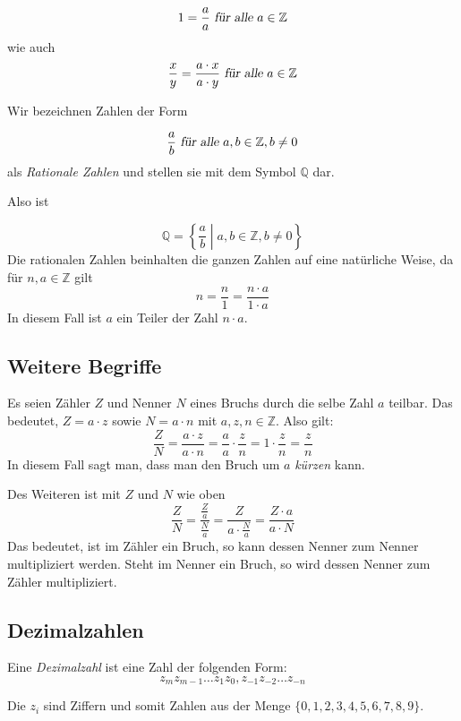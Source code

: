 \[ 1 = \frac{a}{a} \textsl{ für alle } a\in \mathbb{Z} \]
wie auch 
\begin{equation}
\label{relation}
\frac{x}{y} = \frac{a\cdot x}{a\cdot y} \textsl{ für alle } a\in \mathbb{Z}
\end{equation}

\begin{definition}
Wir bezeichnen Zahlen der Form 

\[ \frac{a}{b} \textsl{ für alle } a,b \in \mathbb{Z}, b\ne 0\]
als \textsl{Rationale Zahlen} und stellen sie mit dem Symbol $\mathbb{Q}$ dar. 
\end{definition}
Also ist 

\[ \mathbb{Q} = \left\{ \frac{a}{b} \middle\vert a,b \in \mathbb{Z}, b\ne 0 \right\} \]
Die rationalen Zahlen beinhalten die ganzen Zahlen auf eine natürliche Weise, da für $n,a\in \mathbb{Z}$ gilt
\[ n = \frac{n}{1} = \frac{n \cdot a}{1\cdot a}\]
In diesem Fall ist $a$ ein Teiler der Zahl $n\cdot a$. 

\subsection{Weitere Begriffe}

\begin{definition}
Es seien Zähler $Z$ und Nenner $N$ eines Bruchs durch die selbe Zahl $a$ teilbar. Das bedeutet, $Z=a\cdot z$ sowie $N=a\cdot n$ mit $a,z,n\in \mathbb{Z}$. Also gilt:
\[
\frac{Z}{N} = \frac{a\cdot z}{a\cdot n} = \frac{a}{a}\cdot \frac{z}{n} = 1\cdot \frac{z}{n} = \frac{z}{n}
\]
In diesem Fall sagt man, dass man den Bruch um $a$ \textsl{kürzen} kann.
\end{definition}

Des Weiteren ist mit $Z$ und $N$ wie oben
\[
\frac{Z}{N} = \frac{\frac{Z}{a}}{\frac{N}{a}} = \frac{Z}{a\cdot \frac{N}{a}} = \frac{Z \cdot a}{a\cdot N}
\]
Das bedeutet, ist im Zähler ein Bruch, so kann dessen Nenner zum Nenner multipliziert werden. Steht im Nenner ein Bruch, so wird dessen Nenner zum Zähler multipliziert. 

\subsection{Dezimalzahlen}

\begin{definition}
Eine \textsl{Dezimalzahl} ist eine Zahl der folgenden Form:
\[ z_m z_{m-1} \dots z_1 z_0, z_{-1} z_{-2} \dots z_{-n} \]
\end{definition}
Die $z_i$ sind Ziffern und somit Zahlen aus der Menge $\{0,1,2,3,4,5,6,7,8,9\}$.

